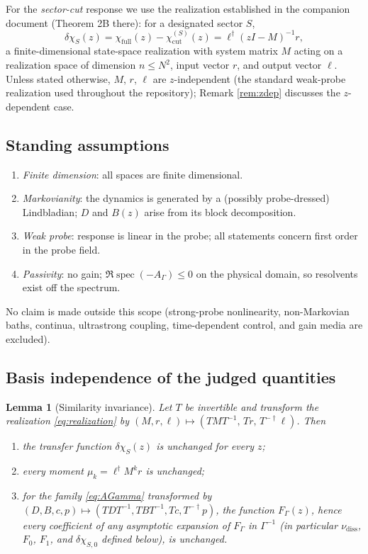 \documentclass[11pt]{article}
\newtheorem{lemma}{Lemma}
\newcommand{\nudiss}{\nu_{\mathrm{diss}}}
\begin{document}
For the \emph{sector-cut} response we use the realization established in the
companion document (Theorem 2B there): for a designated sector $S$,
\begin{equation}
\delta\chi_S(z)
 =\chi_{\mathrm{full}}(z)-\chi_{\mathrm{cut}}^{(S)}(z)
 =\ell^\dagger (zI-M)^{-1} r ,
\label{eq:realization}
\end{equation}
a finite-dimensional state-space realization with system matrix $M$ acting on
a realization space of dimension $n\le N^2$, input vector $r$, and output
vector $\ell$. Unless stated otherwise, $M$, $r$, $\ell$ are $z$-independent
(the standard weak-probe realization used throughout the repository); Remark
\ref{rem:zdep} discusses the $z$-dependent case.

\subsection{Standing assumptions}

\begin{enumerate}[label=(A\arabic*),nosep]
\item \emph{Finite dimension}: all spaces are finite dimensional.
\item \emph{Markovianity}: the dynamics is generated by a (possibly
      probe-dressed) Lindbladian; $D$ and $B(z)$ arise from its
      block decomposition.
\item \emph{Weak probe}: response is linear in the probe; all statements
      concern first order in the probe field.
\item \emph{Passivity}: no gain; $\Re\operatorname{spec}(-A_\Gamma)\le0$ on the
      physical domain, so resolvents exist off the spectrum.
\end{enumerate}
No claim is made outside this scope (strong-probe nonlinearity, non-Markovian
baths, continua, ultrastrong coupling, time-dependent control, and gain media
are excluded).

\subsection{Basis independence of the judged quantities}

\begin{lemma}[Similarity invariance]
\label{lem:basis}
Let $T$ be invertible and transform the realization \eqref{eq:realization} by
$(M,r,\ell)\mapsto(TMT^{-1},\,Tr,\,T^{-\dagger}\ell)$. Then
\begin{enumerate}[label=(\roman*),nosep]
\item the transfer function $\delta\chi_S(z)$ is unchanged for every $z$;
\item every moment $\mu_k=\ell^\dagger M^k r$ is unchanged;
\item for the family \eqref{eq:AGamma} transformed by
      $(D,B,c,p)\mapsto(TDT^{-1},TBT^{-1},Tc,T^{-\dagger}p)$, the function
      $F_\Gamma(z)$, hence every coefficient of any asymptotic expansion of
      $F_\Gamma$ in $\Gamma^{-1}$ (in particular $\nudiss$, $F_0$, $F_1$, and
      $\delta\chi_{S,0}$ defined below), is unchanged.
\end{enumerate}
\end{lemma}
\end{document}
